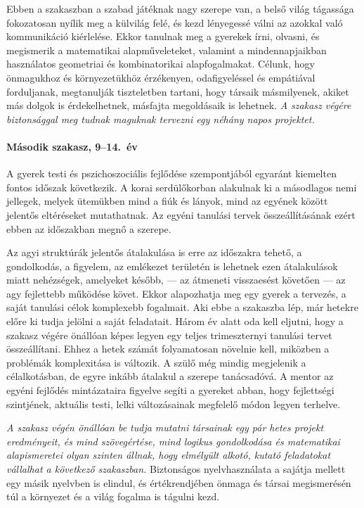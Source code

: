 Ebben a szakaszban a szabad játéknak nagy szerepe van, a belső világ
tágassága fokozatosan nyílik meg a külvilág felé, és kezd lényegessé
válni az azokkal való kommunikáció kiérlelése. Ekkor tanulnak meg a
gyerekek írni, olvasni, és megismerik a matematikai alapműveleteket,
valamint a mindennapjaikban használatos geometriai és kombinatorikai
alapfogalmakat. Célunk, hogy önmagukhoz és környezetükhöz érzékenyen,
odafigyeléssel és empátiával forduljanak, megtanulják tiszteletben
tartani, hogy társaik másmilyenek, akiket más dolgok is érdekelhetnek,
másfajta megoldásaik is lehetnek. \emph{A szakasz végére biztonsággal
meg tudnak maguknak tervezni egy néhány napos projektet.}

\hypertarget{masodik-szakasz-914-ev}{%
\paragraph{Második szakasz, 9--14.\ év}\label{masodik-szakasz-914-ev}}

A gyerek testi és pszichoszociális fejlődése szempontjából egyaránt
kiemelten fontos időszak következik. A korai serdülőkorban alakulnak ki
a másodlagos nemi jellegek, melyek ütemükben mind a fiúk és lányok, mind
az egyének között jelentős eltéréseket mutathatnak. Az egyéni tanulási
tervek összeállításának ezért ebben az időszakban megnő a szerepe.

Az agyi struktúrák jelentős átalakulása is erre az időszakra tehető, a
gondolkodás, a figyelem, az emlékezet területén is lehetnek ezen
átalakulások miatt nehézségek, amelyeket később, --- az átmeneti
visszaesést követően --- az agy fejlettebb működése követ. Ekkor
alapozhatja meg egy gyerek a tervezés, a saját tanulási célok komplexebb
fogalmait. Aki ebbe a szakaszba lép, már hetekre előre ki tudja jelölni
a saját feladatait. Három év alatt oda kell eljutni, hogy a szakasz
végére önállóan képes legyen egy teljes trimeszternyi tanulási tervet
összeállítani. Ehhez a hetek számát folyamatosan növelnie kell, miközben
a problémák komplexitása is változik. A szülő még mindig megjelenik a
célalkotásban, de egyre inkább átalakul a szerepe tanácsadóvá. A mentor
az egyéni fejlődés mintázataira figyelve segíti a gyereket abban, hogy
fejlettségi szintjének, aktuális testi, lelki változásainak megfelelő
módon legyen terhelve.

\emph{A szakasz végén önállóan be tudja mutatni társainak egy pár hetes
projekt eredményeit, és mind szövegértése, mind logikus gondolkodása és
matematikai alapismeretei olyan szinten állnak, hogy elmélyült alkotó,
kutató feladatokat vállalhat a következő szakaszban.} Biztonságos
nyelvhasználata a sajátja mellett egy másik nyelvben is elindul, és
értékrendjében önmaga és társai megismerésén túl a környezet és a világ
fogalma is tágulni kezd.

